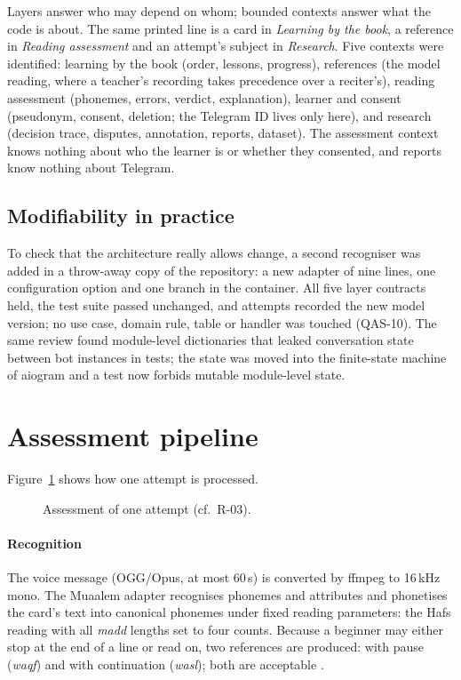 Layers answer who may depend on whom; bounded contexts answer what the code is about. The same printed line
is a card in \emph{Learning by the book}, a reference in \emph{Reading assessment} and an attempt's subject in
\emph{Research}. Five contexts were identified: learning by the book (order, lessons, progress), references
(the model reading, where a teacher's recording takes precedence over a reciter's), reading assessment
(phonemes, errors, verdict, explanation), learner and consent (pseudonym, consent, deletion; the Telegram ID
lives only here), and research (decision trace, disputes, annotation, reports, dataset). The assessment
context knows nothing about who the learner is or whether they consented, and reports know nothing about
Telegram.

\subsection{Modifiability in practice}

To check that the architecture really allows change, a second recogniser was added in a throw-away copy of
the repository: a new adapter of nine lines, one configuration option and one branch in the container. All
five layer contracts held, the test suite passed unchanged, and attempts recorded the new model version; no
use case, domain rule, table or handler was touched (QAS-10). The same review found module-level
dictionaries that leaked conversation state between bot instances in tests; the state was moved into the
finite-state machine of aiogram and a test now forbids mutable module-level state.

\section{Assessment pipeline}\label{sec:impl-assessment}

Figure~\ref{fig:pipeline} shows how one attempt is processed.

\begin{figure}[ht]
\centering
\resizebox{\linewidth}{!}{}
\caption{Assessment of one attempt (cf.\ R-03).}\label{fig:pipeline}
\end{figure}

\paragraph{Recognition} The voice message (OGG/Opus, at most 60\,s) is converted by ffmpeg to 16\,kHz mono.
The Muaalem adapter recognises phonemes and attributes and phonetises the card's text into canonical
phonemes under fixed reading parameters: the Hafs reading with all \emph{madd} lengths set to four counts.
Because a beginner may either stop at the end of a line or read on, two references are produced: with pause
(\emph{waqf}) and with continuation (\emph{wasl}); both are acceptable \cite{SRC-002,SRC-062}.


